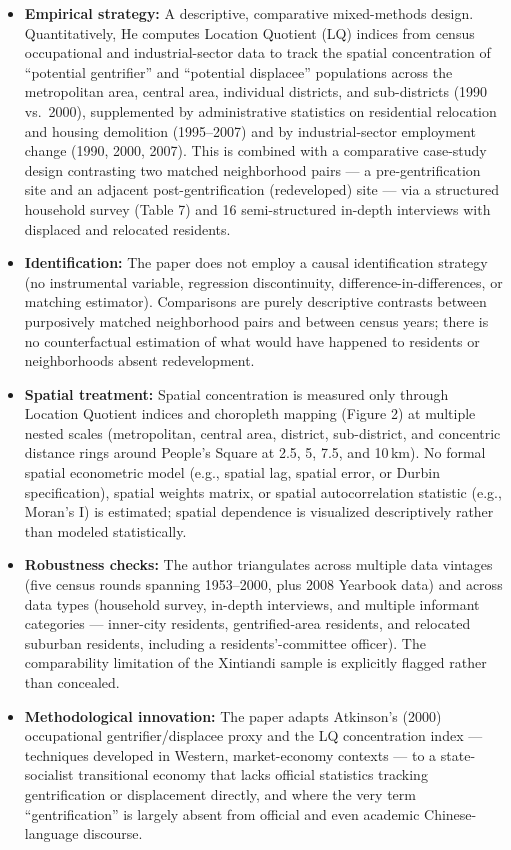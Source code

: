\begin{itemize}
  \item \textbf{Empirical strategy:} A descriptive, comparative mixed-methods design. Quantitatively, He computes Location Quotient (LQ) indices from census occupational and industrial-sector data to track the spatial concentration of ``potential gentrifier'' and ``potential displacee'' populations across the metropolitan area, central area, individual districts, and sub-districts (1990 vs.\ 2000), supplemented by administrative statistics on residential relocation and housing demolition (1995--2007) and by industrial-sector employment change (1990, 2000, 2007). This is combined with a comparative case-study design contrasting two matched neighborhood pairs --- a pre-gentrification site and an adjacent post-gentrification (redeveloped) site --- via a structured household survey (Table 7) and 16 semi-structured in-depth interviews with displaced and relocated residents.
  \item \textbf{Identification:} The paper does not employ a causal identification strategy (no instrumental variable, regression discontinuity, difference-in-differences, or matching estimator). Comparisons are purely descriptive contrasts between purposively matched neighborhood pairs and between census years; there is no counterfactual estimation of what would have happened to residents or neighborhoods absent redevelopment.
  \item \textbf{Spatial treatment:} Spatial concentration is measured only through Location Quotient indices and choropleth mapping (Figure 2) at multiple nested scales (metropolitan, central area, district, sub-district, and concentric distance rings around People's Square at 2.5, 5, 7.5, and 10\,km). No formal spatial econometric model (e.g., spatial lag, spatial error, or Durbin specification), spatial weights matrix, or spatial autocorrelation statistic (e.g., Moran's I) is estimated; spatial dependence is visualized descriptively rather than modeled statistically.
  \item \textbf{Robustness checks:} The author triangulates across multiple data vintages (five census rounds spanning 1953--2000, plus 2008 Yearbook data) and across data types (household survey, in-depth interviews, and multiple informant categories --- inner-city residents, gentrified-area residents, and relocated suburban residents, including a residents'-committee officer). The comparability limitation of the Xintiandi sample is explicitly flagged rather than concealed.
  \item \textbf{Methodological innovation:} The paper adapts Atkinson's (2000) occupational gentrifier/displacee proxy and the LQ concentration index --- techniques developed in Western, market-economy contexts --- to a state-socialist transitional economy that lacks official statistics tracking gentrification or displacement directly, and where the very term ``gentrification'' is largely absent from official and even academic Chinese-language discourse.
\end{itemize}

